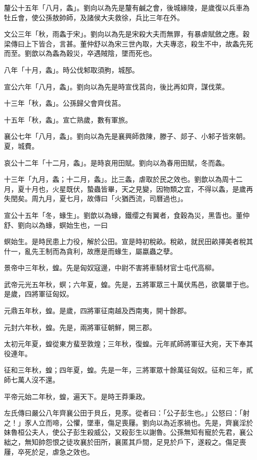 \begin{pinyinscope}
釐公十五年「八月，螽」。劉向以為先是釐有鹹之會，後城緣陵，是歲復以兵車為牡丘會，使公孫敖帥師，及諸侯大夫救徐，兵比三年在外。

文公三年「秋，雨螽于宋」。劉向以為先是宋殺大夫而無罪，有暴虐賦斂之應。穀梁傳曰上下皆合，言甚。董仲舒以為宋三世內取，大夫專恣，殺生不中，故螽先死而至。劉歆以為螽為穀災，卒遇賊陰，墜而死也。

八年「十月，螽」。時公伐邾取須朐，城郚。

宣公六年「八月，螽」。劉向以為先是時宣伐莒向，後比再如齊，謀伐萊。

十三年「秋，螽」。公孫歸父會齊伐莒。

十五年「秋，螽」。宣亡熟歲，數有軍旅。

襄公七年「八月，螽」。劉向以為先是襄興師救陳，滕子、郯子、小邾子皆來朝。夏，城費。

哀公十二年「十二月，螽」。是時哀用田賦。劉向以為春用田賦，冬而螽。

十三年「九月，螽；十二月，螽」。比三螽，虐取於民之效也。劉歆以為周十二月，夏十月也，火星既伏，蟄蟲皆畢，天之見變，因物類之宜，不得以螽，是歲再失閏矣。周九月，夏七月，故傳曰「火猶西流，司曆過也」。

宣公十五年「冬，蝝生」。劉歆以為蝝，鐵缨之有翼者，食穀為災，黑眚也。董仲舒、劉向以為蝝，螟始生也，一曰

螟始生。是時民患上力役，解於公田。宣是時初稅畝。稅畝，就民田畝擇美者稅其什一，亂先王制而為貪利，故應是而蝝生，屬蠃蟲之孽。

景帝中三年秋，蝗。先是匈奴寇邊，中尉不害將車騎材官士屯代高柳。

武帝元光五年秋，螟；六年夏，蝗。先是，五將軍眾三十萬伏馬邑，欲襲單于也。是歲，四將軍征匈奴。

元鼎五年秋，蝗。是歲，四將軍征南越及西南夷，開十餘郡。

元封六年秋，蝗。先是，兩將軍征朝鮮，開三郡。

太初元年夏，蝗從東方蜚至敦煌；三年秋，復蝗。元年貳師將軍征大宛，天下奉其役連年。

征和三年秋，蝗；四年夏，蝗。先是一年，三將軍眾十餘萬征匈奴。征和三年，貳師七萬人沒不還。

平帝元始二年秋，蝗，遍天下。是時王莽秉政。

左氏傳曰嚴公八年齊襄公田于貝丘，見豕。從者曰：「公子彭生也。」公怒曰：「射之！」豕人立而啼，公懼，墜車，傷足喪屨。劉向以為近豕禍也。先是，齊襄淫於妹魯桓公夫人，使公子彭生殺威公，又殺彭生以謝魯。公孫無知有寵於先君，襄公絀之，無知帥怨恨之徒攻襄於田所，襄匿其戶間，足見於戶下，遂殺之。傷足喪屨，卒死於足，虐急之效也。


\end{pinyinscope}
